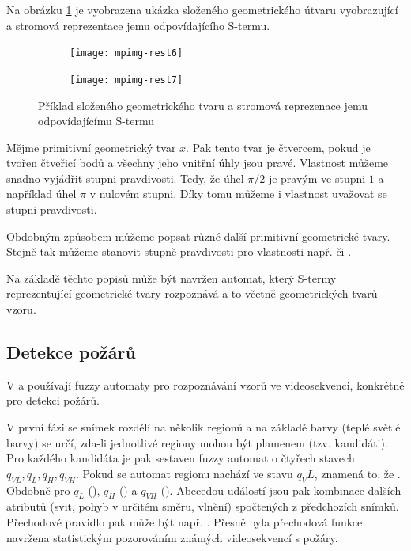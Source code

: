 \documentclass[a4paper,10pt]{article}
\begin{document}
\begin{example}
  Na obrázku \ref{img:Geoms} je vyobrazena ukázka složeného geometrického útvaru vyobrazující  a stromová reprezentace jemu odpovídajícího S-termu.
\end{example}

\begin{figure} 
 \begin{subfigure}{0.4\textwidth}
  \texttt{[image: mpimg-rest6]}
 \end{subfigure}
 \begin{subfigure}{0.4\textwidth}
  \texttt{[image: mpimg-rest7]}
 \end{subfigure}
 
 \caption{Příklad složeného geometrického tvaru a stromová reprezenace jemu odpovídajícímu S-termu} \label{img:Geoms}
\end{figure}

Mějme primitivní geometrický tvar $x$. Pak tento tvar je čtvercem, pokud je tvořen čtveřicí bodů a všechny jeho vnitřní úhly jsou pravé. Vlastnost  můžeme snadno vyjádřit stupni pravdivosti. Tedy, že úhel $\pi/2$ je pravým ve stupni $1$ a například úhel $\pi$ v nulovém stupni. Díky tomu můžeme i vlastnost  uvažovat se stupni pravdivosti.

Obdobným způsobem můžeme popsat různé další primitivní geometrické tvary. Stejně tak můžeme stanovit stupně pravdivosti pro vlastnosti např.  či .

Na základě těchto popisů může být navržen automat, který S-termy reprezentující geometrické tvary rozpoznává a to včetně geometrických tvarů  vzoru.

\subsection{Detekce požárů}
V \cite{HamKoNam-FirFlaDetBasFuzFinAut} a \cite{KoHamNam-ModForFuFiAuDetIrrFirFla} používají fuzzy automaty pro rozpoznávání vzorů ve videosekvenci, konkrétně pro detekci požárů.

V první fázi se snímek rozdělí na několik regionů a na základě barvy (teplé světlé barvy) se určí, zda-li jednotlivé regiony mohou být plamenem (tzv. kandidáti). Pro každého kandidáta je pak sestaven fuzzy automat o čtyřech stavech $q_{VL}, q_{L}, q_{H}, q_{VH}$. Pokud se automat regionu nachází ve stavu $q_VL$, znamená to, že . Obdobně pro $q_{L}$ (), $q_{H}$ () a $q_{VH}$ (). Abecedou událostí jsou pak kombinace dalších atributů (svit, pohyb v určitém směru, vlnění) spočtených z předchozích snímků. Přechodové pravidlo pak může být např. . Přesně byla přechodová funkce navržena statistickým pozorováním známých videosekvencí s požáry.
\end{document}
